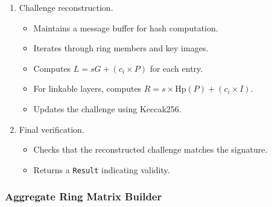 \begin{description}
\begin{enumerate}
\item Challenge reconstruction.  
  \begin{itemize}
  \item Maintains a message buffer for hash computation. %
  \item Iterates through ring members and key images. %
  \item Computes \(L = sG + (c_i \times P)\) for each entry. %
  \item For linkable layers, computes \(R = s \times \mathrm{Hp}(P) + (c_i \times I)\). %
  \item Updates the challenge using Keccak256. %
  \end{itemize}

\item Final verification.  
  \begin{itemize}
  \item Checks that the reconstructed challenge matches the signature. %
  \item Returns a \texttt{Result} indicating validity.  
  \end{itemize}
\end{enumerate}
\end{description}

\subsubsection{Aggregate Ring Matrix Builder}

